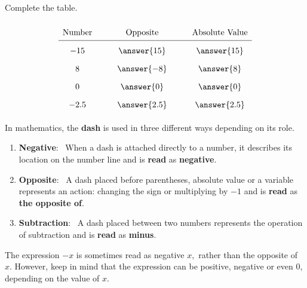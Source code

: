 \documentclass{ximera}[font=12pt]
\begin{document}
\begin{problem}
Complete the table.

\[
\renewcommand{\arraystretch}{1.8}
\begin{array}{c @{\hspace{30pt}} c @{\hspace{30pt}} c}
\text{Number} & \text{Opposite} & \text{Absolute Value} \\
\hline
-15 & \answer{15} & \answer{15} \\
8 & \answer{-8} & \answer{8} \\
0 & \answer{0} & \answer{0} \\
-2.5 & \answer{2.5} & \answer{2.5} \\
\end{array}
\]

\end{problem}

\begin{definition}

In mathematics, the \textbf{dash} is used in three different ways depending on its role.

\begin{enumerate}
    \item \textbf{Negative}: \ When a dash is attached directly to a number, it describes its location on the number line and
    is \textbf{read} as \textbf{negative}. \\

    \item \textbf{Opposite}: \ A dash placed before parentheses, absolute value or a variable represents an action: changing the sign or multiplying by 
    $-1$ and is \textbf{read} as \textbf{the opposite of}. \\

    \item \textbf{Subtraction}: \ A dash placed between two numbers represents the operation of subtraction and is \textbf{read} as \textbf{minus}.
\end{enumerate}

\end{definition}


\begin{remark}
The expression $-x$ is sometimes read as negative $x,$ rather than the opposite of $x.$  However, keep in mind that the expression
can be positive, negative or even 0, depending on the value of $x.$  
\end{remark}
\end{document}
